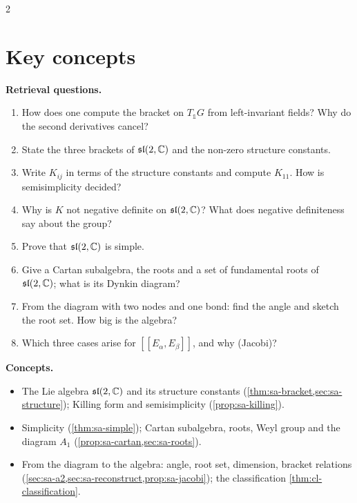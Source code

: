 \begin{paracol}{2}
\section*{Key concepts}
\begin{keyconcepts}
\textbf{Retrieval questions.}
\begin{enumerate}
  \item How does one compute the bracket on $T_{\mathbb 1}G$ from left-invariant fields? Why do the second derivatives cancel?
  \item State the three brackets of $\mathfrak{sl}(2,\mathbb{C})$ and the non-zero structure constants.
  \item Write $K_{ij}$ in terms of the structure constants and compute $K_{11}$. How is semisimplicity decided?
  \item Why is $K$ not negative definite on $\mathfrak{sl}(2,\mathbb{C})$? What does negative definiteness say about the group?
  \item Prove that $\mathfrak{sl}(2,\mathbb{C})$ is simple.
  \item Give a Cartan subalgebra, the roots and a set of fundamental roots of $\mathfrak{sl}(2,\mathbb{C})$; what is its Dynkin diagram?
  \item From the diagram with two nodes and one bond: find the angle and sketch the root set. How big is the algebra?
  \item Which three cases arise for $[\![E_\alpha,E_\beta]\!]$, and why (Jacobi)?
\end{enumerate}
\textbf{Concepts.}
\begin{itemize}
  \item The Lie algebra $\mathfrak{sl}(2,\mathbb{C})$ and its structure constants (\cref{thm:sa-bracket,sec:sa-structure}); Killing form and semisimplicity (\cref{prop:sa-killing}).
  \item Simplicity (\cref{thm:sa-simple}); Cartan subalgebra, roots, Weyl group and the diagram $A_1$ (\cref{prop:sa-cartan,sec:sa-roots}).
  \item From the diagram to the algebra: angle, root set, dimension, bracket relations (\cref{sec:sa-a2,sec:sa-reconstruct,prop:sa-jacobi}); the classification \cref{thm:cl-classification}.
\end{itemize}
\end{keyconcepts}

\flushside
\end{paracol}
